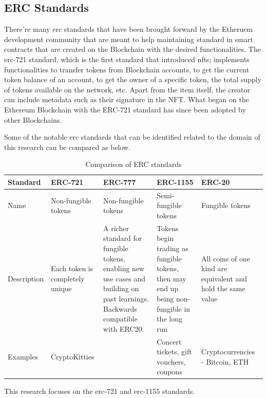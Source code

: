 \subsection{ERC Standards}

There're many \gls{erc} standards that have been brought forward by the Etheruem \autocite{wood_ethereum_2014} development community that are meant to help maintaining standard in smart contracts that are created on the Blockchain with the desired functionalities.
\bigbreak
The \gls{erc}-721 standard, which is the first standard that introduced \gls{nft}s; implements functionalities to transfer tokens from Blockchain accounts, to get the current token balance of an account, to get the owner of a specific token, the total supply of tokens available on the network, etc. Apart from the item itself, the creator can include metadata such as their signature in the NFT. What began on the Ethereum Blockchain with the ERC-721 standard has since been adopted by other Blockchains. 


Some of the notable \gls{erc} standards that can be identified related to the domain of this research can be compared as below.
\begin{longtable}{|p{}|p{}|p{}|p{}|p{}|}
\caption{Comparison of ERC standards}
\label{tab:erc-comparison}\\
\hline
Standard & ERC-721 & ERC-777 & ERC-1155 & ERC-20 \\ 
\hline
Name & Non-fungible tokens & Non-fungible tokens \autocite{dafflon_eip-777_2017} & Semi-fungible tokens & Fungible tokens \\ 
\hline
Description & Each token is completely unique & A richer standard for fungible tokens, enabling new use cases and building on past learnings. Backwards compatible with ERC20. & Tokens begin trading as fungible tokens, then may end up being non-fungible in the long run & All coins of one kind are equivalent and hold the same value \\ 
\hline
Examples & CryptoKitties \autocite{cryptokitties_cryptokitties_nodate} &  & Concert tickets, gift vouchers, coupons & Cryptocurrencies - Bitcoin, ETH \\
\hline
\end{longtable}

This research focuses on the \gls{erc}-721 and \gls{erc}-1155 \autocite{prathap_semi-fungible_2021} standards.

